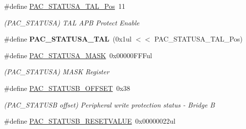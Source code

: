 \begin{DoxyCompactItemize}
\item 
\hypertarget{group___s_a_m_l21___p_a_c_ga9016923c668183f1ee5ddc820d075ff5}{}\#define \hyperlink{group___s_a_m_l21___p_a_c_ga9016923c668183f1ee5ddc820d075ff5}{P\+A\+C\+\_\+\+S\+T\+A\+T\+U\+S\+A\+\_\+\+T\+A\+L\+\_\+\+Pos}~11\label{group___s_a_m_l21___p_a_c_ga9016923c668183f1ee5ddc820d075ff5}

\begin{DoxyCompactList}\small\item\em (P\+A\+C\+\_\+\+S\+T\+A\+T\+U\+S\+A) T\+A\+L A\+P\+B Protect Enable \end{DoxyCompactList}\item 
\hypertarget{group___s_a_m_l21___p_a_c_ga3e94217d7d0e40a52229f89738eb6119}{}\#define {\bfseries P\+A\+C\+\_\+\+S\+T\+A\+T\+U\+S\+A\+\_\+\+T\+A\+L}~(0x1ul $<$$<$ P\+A\+C\+\_\+\+S\+T\+A\+T\+U\+S\+A\+\_\+\+T\+A\+L\+\_\+\+Pos)\label{group___s_a_m_l21___p_a_c_ga3e94217d7d0e40a52229f89738eb6119}

\item 
\hypertarget{group___s_a_m_l21___p_a_c_ga77188759f505eb879ab21ee88f0664e5}{}\#define \hyperlink{group___s_a_m_l21___p_a_c_ga77188759f505eb879ab21ee88f0664e5}{P\+A\+C\+\_\+\+S\+T\+A\+T\+U\+S\+A\+\_\+\+M\+A\+S\+K}~0x00000\+F\+F\+Ful\label{group___s_a_m_l21___p_a_c_ga77188759f505eb879ab21ee88f0664e5}

\begin{DoxyCompactList}\small\item\em (P\+A\+C\+\_\+\+S\+T\+A\+T\+U\+S\+A) M\+A\+S\+K Register \end{DoxyCompactList}\item 
\hypertarget{group___s_a_m_l21___p_a_c_ga409ce85984018c2a3999703ec840ec74}{}\#define \hyperlink{group___s_a_m_l21___p_a_c_ga409ce85984018c2a3999703ec840ec74}{P\+A\+C\+\_\+\+S\+T\+A\+T\+U\+S\+B\+\_\+\+O\+F\+F\+S\+E\+T}~0x38\label{group___s_a_m_l21___p_a_c_ga409ce85984018c2a3999703ec840ec74}

\begin{DoxyCompactList}\small\item\em (P\+A\+C\+\_\+\+S\+T\+A\+T\+U\+S\+B offset) Peripheral write protection status -\/ Bridge B \end{DoxyCompactList}\item 
\hypertarget{group___s_a_m_l21___p_a_c_ga48f2e5152a65d63751ffbc7b321bb1c7}{}\#define \hyperlink{group___s_a_m_l21___p_a_c_ga48f2e5152a65d63751ffbc7b321bb1c7}{P\+A\+C\+\_\+\+S\+T\+A\+T\+U\+S\+B\+\_\+\+R\+E\+S\+E\+T\+V\+A\+L\+U\+E}~0x00000022ul\label{group___s_a_m_l21___p_a_c_ga48f2e5152a65d63751ffbc7b321bb1c7}


\end{DoxyCompactItemize}
